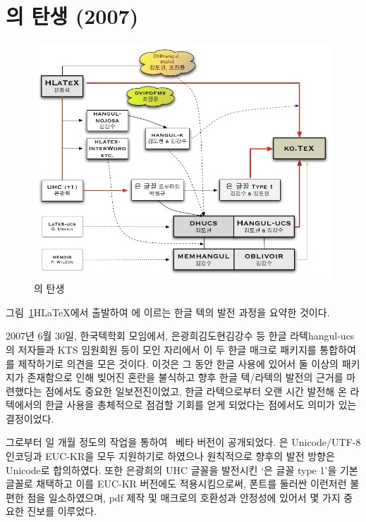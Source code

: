 \section{\protect\kotex 의 탄생 (2007)}

\begin{figure}[t]
\centering
\includegraphics[width=\linewidth]{kotexhist}
\caption{\protect\kotex 의 탄생}\label{fig:hist}
\end{figure}

그림~\ref{fig:hist}\는 H\LaTeX 에서 출발하여 \kotex 에 이르는
한글 텍의 발전 과정을 요약한 것이다. 

2007년 6월 30일, 한국텍학회 모임에서, 은광희\cntrdot 김도현\cntrdot 김강수 등
한글 라텍\cntrdot hangul-ucs의 저자들과 KTS 임원\cntrdot 회원 등이 모인 자리에서
이 두 한글 매크로 패키지를 통합하여 를 제작하기로
의견을 모은 것이다. 이것은 그 동안 한글 사용에 있어서 둘 이상의 패키지가
존재함으로 인해 빚어진 혼란을 불식하고 향후 한글 텍/라텍의 발전의
근거를 마련했다는 점에서도 중요한 일보전진이었고, 한글 라텍으로부터
오랜 시간 발전해 온 라텍에서의 한글 사용을 총체적으로 점검할 기회를
얻게 되었다는 점에서도 의미가 있는 결정이었다.

그로부터 일 개월 정도의 작업을 통하여 \kotex\ 베타 버전이 공개되었다.
\kotex 은 Unicode/UTF-8 인코딩과 EUC-KR을 모두 지원하기로 하였으나
원칙적으로 향후의 발전 방향은 Unicode로 합의하였다. 또한 은광희의
UHC 글꼴을 발전시킨 `은 글꼴 type 1'을 기본 글꼴로 채택하고 이를
EUC-KR 버전에도 적용시킴으로써, 폰트를 둘러싼 이런저런 불편한 점을
일소하였으며, pdf 제작 및 매크로의 호환성과 안정성에 있어서
몇 가지 중요한 진보를 이루었다.


